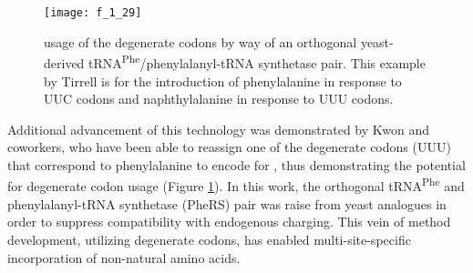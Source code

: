 \begin{refsection}
\begin{figure}[h!] \centering \texttt{[image: f\_1\_29]}
    \caption[ usage of the degenerate codons by way of
    an orthogonal yeast-derived tRNA\textsuperscript{Phe}/phenylalanyl-tRNA
    synthetase pair. This example by Tirrell  is for the
introduction of phenylalanine in response to UUC codons and naphthylalanine in
response to UUU codons.]{ usage of the degenerate codons by way of
    an orthogonal yeast-derived tRNA\textsuperscript{Phe}/phenylalanyl-tRNA
    synthetase pair. This example by Tirrell  is for the
introduction of phenylalanine in response to UUC codons and naphthylalanine in
response to UUU codons.\cite{Link2005,Kwon2003}}
\label{fig:dbl_site_specific_incorporation} \end{figure}
Additional advancement of this technology was
demonstrated by Kwon and coworkers, who have been able to
reassign one of the degenerate codons (UUU) that correspond to phenylalanine to
encode for , thus demonstrating the potential for
degenerate codon usage (Figure \ref{fig:dbl_site_specific_incorporation}).\cite{Kwon2003} In this work, the orthogonal
tRNA\textsuperscript{Phe} and phenylalanyl-tRNA synthetase (PheRS) pair was
raise from yeast analogues in order to suppress compatibility with endogenous
 charging. This vein of method development, utilizing degenerate
codons, has enabled multi-site-specific incorporation of non-natural amino
acids.


\end{refsection}
